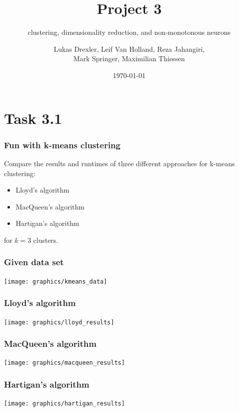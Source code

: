 \documentclass{beamer}
\title[Project 3]{Project 3}
\subtitle{clustering, dimensionality reduction, and non-monotonous neurons}
\author{Lukas Drexler, Leif Van Holland, Reza Jahangiri,\\Mark Springer, Maximilian Thiessen}
\institute[Universität Bonn]{Rheinische Friedrich-Wilhelms-Universität}
\date{\today}
\begin{document}
	
\begin{frame}%
	\titlepage
\end{frame}



\section{Task 3.1}

\begin{frame}
\frametitle{Fun with k-means clustering}
Compare the results and runtimes of three different approaches for k-means clustering:
\begin{itemize}
\item Lloyd's algorithm
\item MacQueen's algorithm
\item Hartigan's algorithm
\end{itemize}
for $k=3$ clusters.
\end{frame}

\begin{frame}
\frametitle{Given data set}
\texttt{[image: graphics/kmeans\_data]}
\end{frame}

\begin{frame}
\frametitle{Lloyd's algorithm}
\texttt{[image: graphics/lloyd\_results]}
\end{frame}

\begin{frame}
\frametitle{MacQueen's algorithm}
\texttt{[image: graphics/macqueen\_results]}
\end{frame}

\begin{frame}
\frametitle{Hartigan's algorithm}
\texttt{[image: graphics/hartigan\_results]}
\end{frame}

\end{document}
